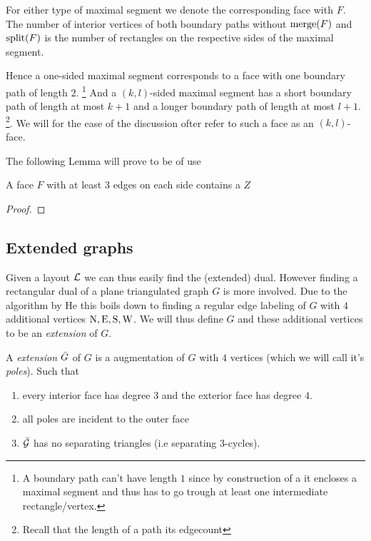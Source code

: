   For either type of maximal segment we denote the corresponding face with $F$. The number of interior vertices of both boundary paths without $\operatorname{merge}(F)$ and $\operatorname{split}(F)$ is the number of rectangles on the respective sides of the maximal segment.

  Hence a one-sided maximal segment corresponds to a face with one boundary path of length $2$. \footnote{A boundary path can't have length $1$ since by construction of a \rel it encloses a maximal segment and thus has to go trough at least one intermediate rectangle/vertex.} And a $(k,l)$-sided maximal segment has a short boundary path of length at most $k+1$ and a longer boundary path of length at most $l+1$. \footnote{Recall that the length of a path its edgecount}.
  We will for the ease of the discussion ofter refer to such a face as an $(k,l)$-face.

  The following Lemma will prove to be of use
  \begin{lemma}
  \label{lm:zInRedFace}
  A face $F$ with at least $3$ edges on each side contains a $Z$
  \end{lemma}
  \begin{proof}
  \end{proof}


\subsection{Extended graphs}
  Given a layout $\mathcal{L}$ we can thus easily find the (extended) dual. However finding a rectangular dual of a plane triangulated graph $G$ is more involved. Due to the algorithm by He \cite{He} this boils down to finding a regular edge labeling of $G$ with $4$ additional vertices $\mathrm{N}, \mathrm{E}, \mathrm{S}, \mathrm{W}$. We will thus define $G$ and these additional vertices to be an \emph{extension} of $G$.

  \begin{defi}[Extension]
    A \emph{extension} $\bar{G}$ of $G$ is a augmentation of $G$ with $4$ vertices (which we will call it's \emph{poles}). Such that
    \begin{enumerate}
    \item every interior face has degree $3$ and the exterior face has degree $4$.
    \item all poles are incident to the outer face
    \item $\bar{\mathcal{G}}$ has no separating triangles (i.e separating $3$-cycles).
    \end{enumerate}
  \end{defi}

